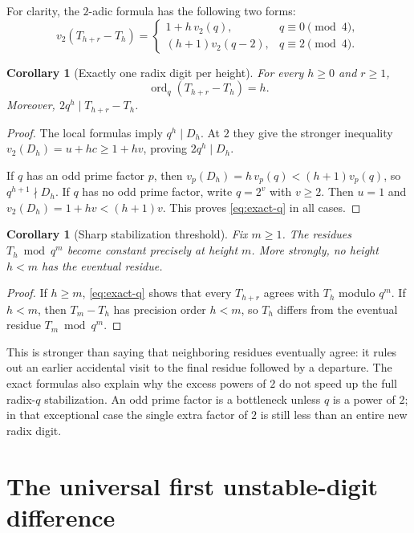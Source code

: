 \documentclass[11pt,a4paper]{article}
\numberwithin{equation}{section}
\theoremstyle{plain}
\newtheorem{corollary}[theorem]{Corollary}
\theoremstyle{definition}
\newcommand{\ordq}{\operatorname{ord}_q}
\begin{document}
For clarity, the $2$-adic formula has the following two forms:
\begin{equation}\label{eq:two-cases}
 v_2(T_{h+r}-T_h)=
 \begin{cases}
 1+h\,v_2(q),&q\equiv0\pmod4,\\
 (h+1)v_2(q-2),&q\equiv2\pmod4.
 \end{cases}
\end{equation}

\begin{corollary}[Exactly one radix digit per height]\label{cor:order}
For every $h\ge0$ and $r\ge1$,
\begin{equation}\label{eq:exact-q}
 \ordq(T_{h+r}-T_h)=h.
\end{equation}
Moreover, $2q^h\mid T_{h+r}-T_h$.
\end{corollary}
\begin{proof}
The local formulas imply $q^h\mid D_h$.  At $2$ they give the stronger
inequality $v_2(D_h)=u+hc\ge1+hv$, proving $2q^h\mid D_h$.

If $q$ has an odd prime factor $p$, then
$v_p(D_h)=h\,v_p(q)<(h+1)v_p(q)$, so $q^{h+1}\nmid D_h$.
If $q$ has no odd prime factor, write $q=2^v$ with $v\ge2$.
Then $u=1$ and $v_2(D_h)=1+hv<(h+1)v$.
This proves \eqref{eq:exact-q} in all cases.
\end{proof}

\begin{corollary}[Sharp stabilization threshold]\label{cor:threshold}
Fix $m\ge1$.  The residues $T_h\bmod q^m$ become constant precisely
at height $m$.  More strongly, no height $h<m$ has the eventual residue.
\end{corollary}
\begin{proof}
If $h\ge m$, \eqref{eq:exact-q} shows that every $T_{h+r}$ agrees
with $T_h$ modulo $q^m$.  If $h<m$, then $T_m-T_h$ has precision
order $h<m$, so $T_h$ differs from the eventual residue $T_m\bmod q^m$.
\end{proof}

This is stronger than saying that neighboring residues eventually agree:
it rules out an earlier accidental visit to the final residue followed
by a departure.  The exact formulas also explain why the excess powers
of $2$ do not speed up the full radix-$q$ stabilization.  An odd prime
factor is a bottleneck unless $q$ is a power of $2$; in that exceptional
case the single extra factor of $2$ is still less than an entire new
radix digit.

\section{The universal first unstable-digit difference}\label{sec:leading}
\end{document}

